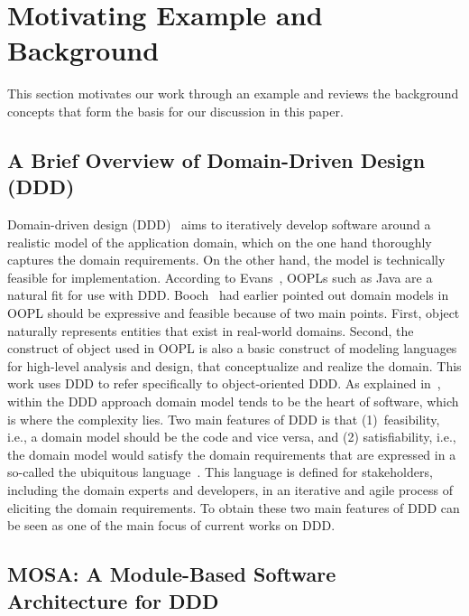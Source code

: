 \section{Motivating Example and Background} \label{sect:background}
This section motivates our work through an example and reviews the background concepts that form the basis for our discussion in this paper.


\subsection{A Brief Overview of Domain-Driven Design (DDD)}
\label{sect:bg-arch} %

Domain-driven design (DDD)~\cite{evans_domain-driven_2004} aims to iteratively develop software around a realistic model of the application domain, which on the one hand thoroughly captures the domain requirements. On the other hand, the model is technically feasible for implementation. According to Evans~\cite{evans_domain-driven_2004}, OOPLs such as Java are a natural fit for use with DDD. Booch~\cite{booch_object-oriented_1986} had earlier pointed out domain models in OOPL should be expressive and feasible because of two main points. First, object naturally represents entities that exist in real-world domains. Second, the construct of object used in OOPL is also a basic construct of modeling languages for high-level analysis and design, that conceptualize and realize the domain. This work uses DDD to refer specifically to object-oriented DDD. As explained in~\cite{evans_domain-driven_2004}, within the DDD approach domain model tends to be the heart of software, which is where the complexity lies. Two main features of DDD is that (1)~feasibility, i.e., a domain model should be the code and vice versa, and (2) satisfiability, i.e., the domain model would satisfy the domain requirements that are expressed in a so-called the ubiquitous language~\cite{evans_domain-driven_2004}. This language is defined for stakeholders, including the domain experts and developers, in an iterative and agile process of eliciting the domain requirements. To obtain these two main features of DDD can be seen as one of the main focus of current works on DDD. 

\subsection{MOSA: A Module-Based Software Architecture for DDD}
\label{sect:bg-arch} %


